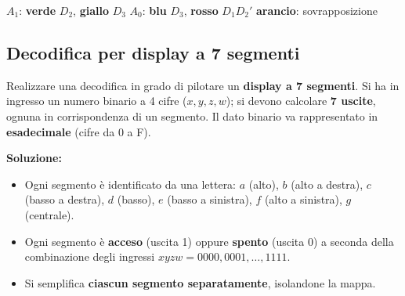 \documentclass[12pt, a4paper]{article}
\begin{document}
\begin{center}
$A_1$: \textcolor{green!50!black}{\textbf{verde}} $D_2$, \textcolor{yellow!50!black}{\textbf{giallo}} $D_3$ \qquad $A_0$: \textcolor{blue!70!black}{\textbf{blu}} $D_3$, \textcolor{red!80!black}{\textbf{rosso}} $D_1D_2'$ \qquad \textcolor{orange!90!black}{\textbf{arancio}}: sovrapposizione
\end{center}

\subsection{Decodifica per display a 7 segmenti}

\begin{tcolorbox}[colback=lightergray!10, colframe=tocsec, title=\textbf{Esercizio: decodifica per display a 7 segmenti}]
Realizzare una decodifica in grado di pilotare un \textbf{display a 7 segmenti}. Si ha in ingresso un numero binario a 4 cifre ($x, y, z, w$); si devono calcolare \textbf{7 uscite}, ognuna in corrispondenza di un segmento. Il dato binario va rappresentato in \textbf{esadecimale} (cifre da 0 a F).
\end{tcolorbox}

\textbf{Soluzione:}
\begin{itemize}
    \item Ogni segmento è identificato da una lettera: $a$ (alto), $b$ (alto a destra), $c$ (basso a destra), $d$ (basso), $e$ (basso a sinistra), $f$ (alto a sinistra), $g$ (centrale).
    \item Ogni segmento è \textbf{acceso} (uscita 1) oppure \textbf{spento} (uscita 0) a seconda della combinazione degli ingressi $xyzw = 0000, 0001, \dots, 1111$.
    \item Si semplifica \textbf{ciascun segmento separatamente}, isolandone la mappa.
\end{itemize}
\end{document}
